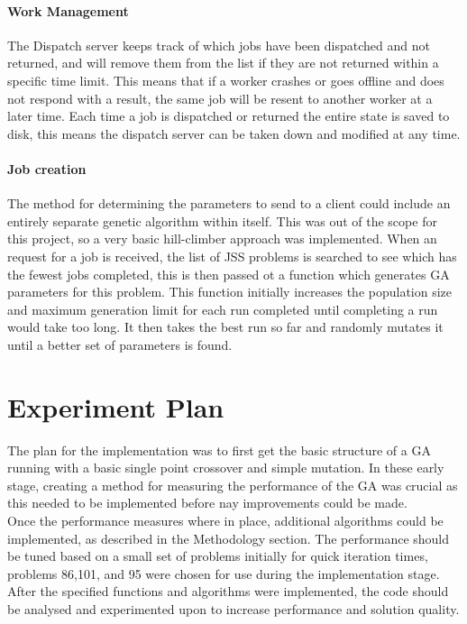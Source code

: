 \documentclass[14pt]{acmsiggraph}
\begin{document}
	\paragraph{Work Management}
	The Dispatch server keeps track of which jobs have been dispatched and not returned, and will remove them from the list if they are not returned within a specific time limit. This means that if a worker crashes or goes offline and does not respond with a result, the same job will be resent to another worker at a later time. Each time a job is dispatched or returned the entire state is saved to disk, this means the dispatch server can be taken down and modified at any time.
	
	\paragraph{Job creation}
	The method for determining the parameters to send to a client could include an entirely separate genetic algorithm within itself. This was out of the scope for this project, so a very basic hill-climber approach was implemented. When an request for a job is received, the list of JSS problems is searched to see which has the fewest jobs completed, this is then passed ot a function which generates GA parameters for this problem. This function initially increases the population size and maximum generation limit for each run completed until completing a run would take too long. It then takes the best run so far and randomly mutates it until a better set of parameters is found.
	
	\section{Experiment Plan}
	The plan for the implementation was to first get the basic structure of a GA running with a basic single point crossover and simple mutation. In these early stage, creating a method for measuring the performance of the GA was crucial as this needed to be implemented before nay improvements could be made. \\
	Once the performance measures where in place, additional algorithms could be implemented, as described in the Methodology section. The performance should be tuned based on a small set of problems initially for quick iteration times, problems 86,101, and 95 were chosen for use during the implementation stage.\\
	After the specified functions and algorithms were implemented, the code should be analysed and experimented upon to increase performance and solution quality.\\
	
\end{document}
